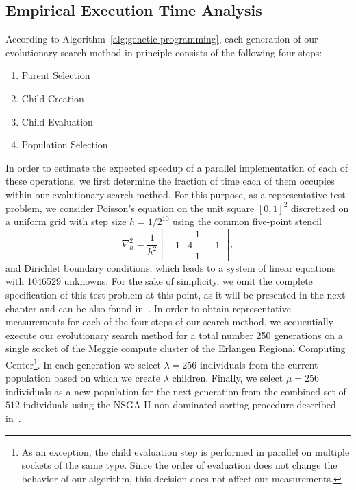 \subsection{Empirical Execution Time Analysis}
According to Algorithm~\ref{alg:genetic-programming}, each generation of our evolutionary search method in principle consists of the following four steps:
\begin{enumerate}
	\item Parent Selection
	\item Child Creation
	\item Child Evaluation
	\item Population Selection
\end{enumerate}
In order to estimate the expected speedup of a parallel implementation of each of these operations, we first determine the fraction of time each of them occupies within our evolutionary search method.
For this purpose, as a representative test problem, we consider Poisson's equation on the unit square $\left[0,1\right]^2$ discretized on a uniform grid with step size $h = 1/2^{10}$ using the common five-point stencil
\begin{equation*}
	\nabla^2_h = 
	\frac{1}{h^2} \begin{bmatrix}
		& -1 & \\
		-1 & 4 & -1 \\
		& -1 &  
	\end{bmatrix},
\end{equation*}
and Dirichlet boundary conditions, which leads to a system of linear equations with 1046529 unknowns.
For the sake of simplicity, we omit the complete specification of this test problem at this point, as it will be presented in the next chapter and can be also found in~\cite{schmitt2021evostencils}.
In order to obtain representative measurements for each of the four steps of our search method, we sequentially execute our evolutionary search method for a total number 250 generations on a single socket of the Meggie compute cluster of the Erlangen Regional Computing Center\footnote{As an exception, the child evaluation step is performed in parallel on multiple sockets of the same type. Since the order of evaluation does not change the behavior of our algorithm, this decision does not affect our measurements.}.
In each generation we select $\lambda = 256$ individuals from the current population based on which we create $\lambda$ children.
Finally, we select $\mu = 256$ individuals as a new population for the next generation from the combined set of $512$ individuals using the NSGA-II non-dominated sorting procedure described in~\cite{deb2002fast}.
